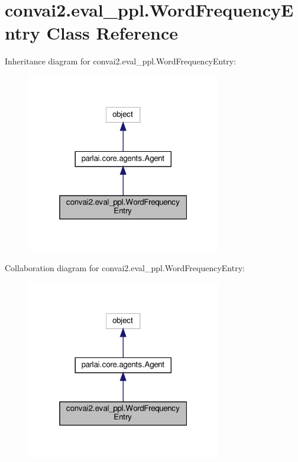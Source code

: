 \hypertarget{classconvai2_1_1eval__ppl_1_1WordFrequencyEntry}{}\section{convai2.\+eval\+\_\+ppl.\+Word\+Frequency\+Entry Class Reference}
\label{classconvai2_1_1eval__ppl_1_1WordFrequencyEntry}


Inheritance diagram for convai2.\+eval\+\_\+ppl.\+Word\+Frequency\+Entry\+:
\nopagebreak
\begin{figure}[H]
\begin{center}
\leavevmode
\includegraphics[width=241pt]{classconvai2_1_1eval__ppl_1_1WordFrequencyEntry__inherit__graph}
\end{center}
\end{figure}


Collaboration diagram for convai2.\+eval\+\_\+ppl.\+Word\+Frequency\+Entry\+:
\nopagebreak
\begin{figure}[H]
\begin{center}
\leavevmode
\includegraphics[width=241pt]{classconvai2_1_1eval__ppl_1_1WordFrequencyEntry__coll__graph}
\end{center}
\end{figure}
